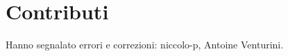 \documentclass[italian,a4paper,hidelinks,headinclude]{scrartcl}
\renewcommand{\vec}[1]{\boldsymbol{#1}}
\begin{document}
\begin{comment}
Per mostrare che $\phi$ è suriettiva prendiamo qualunque $v \in V$.
Visto che $\mathcal B$ è una base devono esitere $b_1, \dots, b_n \in \mathcal B$
tali che
\[
  v =  \sum_{k=1}^n x_k b_k.
\]
Ma allora è chiaro che $v= \phi(\vec x)$ dove $\vec x\in K_c^{\mathcal B}$
è la funzione nulla su tutti gli elementi di $\mathcal B$ tranne $b_1, \dots, b_n$
dove si pone $\vec x(b_k) = x_k$.
\end{proof}

\begin{theorem}[dimensione]
Se $\mathcal B$ e $\mathcal B'$ sono due basi di uno stesso spazio
vettoriale $V$ allora $\# \mathcal B = \# \mathcal B'$.
\end{theorem}
%
\begin{proof}

*** NON BANALE !!! ***
\end{proof}

\end{comment}

%
\section{Contributi}

Hanno segnalato errori e correzioni:
niccolo-p,
Antoine Venturini.
\end{document}
